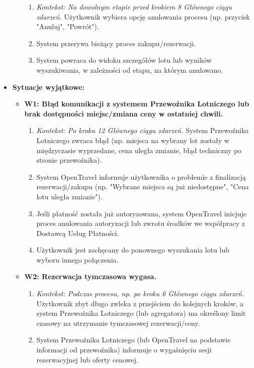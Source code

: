 \documentclass[a4paper,12pt]{article}
\begin{document}
\begin{itemize}
\begin{itemize}
                \begin{enumerate}
                    \item \textit{Kontekst: Na dowolnym etapie przed krokiem 8 Głównego ciągu zdarzeń.} Użytkownik wybiera opcję anulowania procesu (np. przycisk "Anuluj", "Powrót").
                    \item System przerywa bieżący proces zakupu/rezerwacji.
                    \item System powraca do widoku szczegółów lotu lub wyników wyszukiwania, w zależności od etapu, na którym anulowano.
                \end{enumerate}
        \end{itemize}
    \item \textbf{Sytuacje wyjątkowe:}
        \begin{itemize}
            \item \textbf{W1: Błąd komunikacji z systemem Przewoźnika Lotniczego lub brak dostępności miejsc/zmiana ceny w ostatniej chwili.}
                \begin{enumerate}
                    \item \textit{Kontekst: Po kroku 12 Głównego ciągu zdarzeń.} System Przewoźnika Lotniczego zwraca błąd (np. miejsca na wybrany lot zostały w międzyczasie wyprzedane, cena uległa zmianie, błąd techniczny po stronie przewoźnika).
                    \item System OpenTravel informuje użytkownika o problemie z finalizacją rezerwacji/zakupu (np. "Wybrane miejsca są już niedostępne", "Cena lotu uległa zmianie").
                    \item Jeśli płatność została już autoryzowana, system OpenTravel inicjuje proces anulowania autoryzacji lub zwrotu środków we współpracy z Dostawcą Usług Płatności.
                    \item Użytkownik jest zachęcany do ponownego wyszukania lotu lub wyboru innego połączenia.
                \end{enumerate}
            \item \textbf{W2: Rezerwacja tymczasowa wygasa.}
                \begin{enumerate}
                    \item \textit{Kontekst: Podczas procesu, np. po kroku 6 Głównego ciągu zdarzeń.} Użytkownik zbyt długo zwleka z przejściem do kolejnych kroków, a system Przewoźnika Lotniczego (lub agregatora) ma określony limit czasowy na utrzymanie tymczasowej rezerwacji/ceny.
                    \item System Przewoźnika Lotniczego (lub OpenTravel na podstawie informacji od przewoźnika) informuje o wygaśnięciu sesji rezerwacyjnej lub oferty cenowej.

\end{enumerate}
\end{itemize}
\end{itemize}
\end{document}

